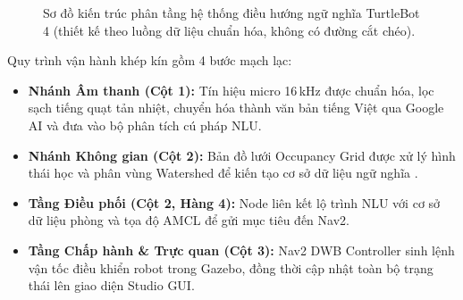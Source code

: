 \begin{figure}[H]
\caption{Sơ đồ kiến trúc phân tầng hệ thống điều hướng ngữ nghĩa TurtleBot 4 (thiết kế theo luồng dữ liệu chuẩn hóa, không có đường cắt chéo).}
\label{fig:system_architecture}
\end{figure}

Quy trình vận hành khép kín gồm 4 bước mạch lạc:
\begin{itemize}
    \item \textbf{Nhánh Âm thanh (Cột 1):} Tín hiệu micro 16\,kHz được chuẩn hóa, lọc sạch tiếng quạt tản nhiệt, chuyển hóa thành văn bản tiếng Việt qua Google AI và đưa vào bộ phân tích cú pháp NLU.
    \item \textbf{Nhánh Không gian (Cột 2):} Bản đồ lưới Occupancy Grid được xử lý hình thái học và phân vùng Watershed để kiến tạo cơ sở dữ liệu ngữ nghĩa .
    \item \textbf{Tầng Điều phối (Cột 2, Hàng 4):} Node  liên kết lộ trình NLU với cơ sở dữ liệu phòng và tọa độ AMCL để gửi mục tiêu đến Nav2.
    \item \textbf{Tầng Chấp hành & Trực quan (Cột 3):} Nav2 DWB Controller sinh lệnh vận tốc  điều khiển robot trong Gazebo, đồng thời cập nhật toàn bộ trạng thái lên giao diện Studio GUI.
\end{itemize}
